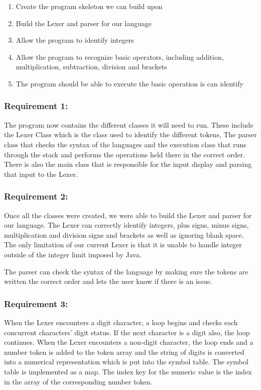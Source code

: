 \documentclass[a4paper, oneside, 11pt]{report}
\begin{document}
\begin{enumerate}
\item Create the program skeleton we can build upon 
\item Build the Lexer and parser for our language 
\item Allow the program to identify integers 
\item Allow the program to recognize basic operators, including addition, multiplication, subtraction, division and brackets 
\item The program should be able to execute the basic operation is can identify 
\end{enumerate}

\subsubsection{Requirement 1: }

The program now contains the different classes it will need to run. These include the Lexer Class which is the class used to identify the different tokens, The parser class that checks the syntax of the languages and the execution class that runs through the stack and performs the operations held there in the correct order. There is also the main class that is responsible for the input display and parsing that input to the Lexer. 

\subsubsection{Requirement 2: }

Once all the classes were created, we were able to build the Lexer and parser for our language. The Lexer can correctly identify integers, plus signs, minus signs, multiplication and division signs and brackets as well as ignoring blank space. The only limitation of our current Lexer is that it is unable to handle integer outside of the integer limit imposed by Java. 

The parser can check the syntax of the language by making sure the tokens are written the correct order and lets the user know if there is an issue. 

\subsubsection{Requirement 3: }

When the Lexer encounters a digit character, a loop begins and checks each concurrent characters’ digit status. If the next character is a digit also, the loop continues. When the Lexer encounters a non-digit character, the loop ends and a number token is added to the token array and the string of digits is converted into a numerical representation which is put into the symbol table. The symbol table is implemented as a map. The index key for the numeric value is the index in the array of the corresponding number token. 
\end{document}
